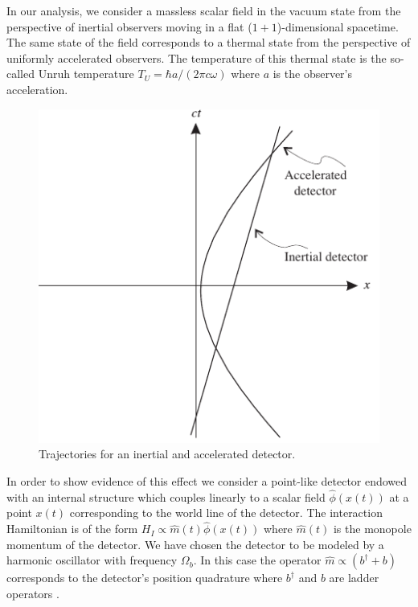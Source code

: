 In our analysis, we consider a massless scalar field in the vacuum state from the perspective of inertial observers moving in a flat ($1+1$)-dimensional spacetime. The same state of the field corresponds to a thermal state from the perspective of uniformly accelerated observers.  The temperature of this thermal state is the so-called Unruh temperature $T_U=\hbar a / (2\pi c \omega)$ where $a$ is the observer's acceleration.
\begin{figure}[h]
\begin{center}
\includegraphics[width=.70\textwidth]{traj}
\caption{Trajectories for an inertial and accelerated detector.}
\label{setup}
\end{center}
\end{figure}
In order to show evidence of this effect we consider a point-like detector endowed with an internal structure which couples linearly to a scalar field $\hat\phi(x(t))$ at a point $x(t)$ corresponding to the world line of the detector. The interaction Hamiltonian is of the form $H_I\propto  \hat m(t) \hat \phi(x(t))$ where $\hat m(t)$ is the monopole momentum of the detector. We have chosen the detector to be modeled by a  harmonic oscillator with frequency $\Omega_b$. In this case the operator $\hat m\propto (b^\dagger + b)$ corresponds to the detector's position quadrature where $b^{\dagger}$ and $b$ are ladder operators .

